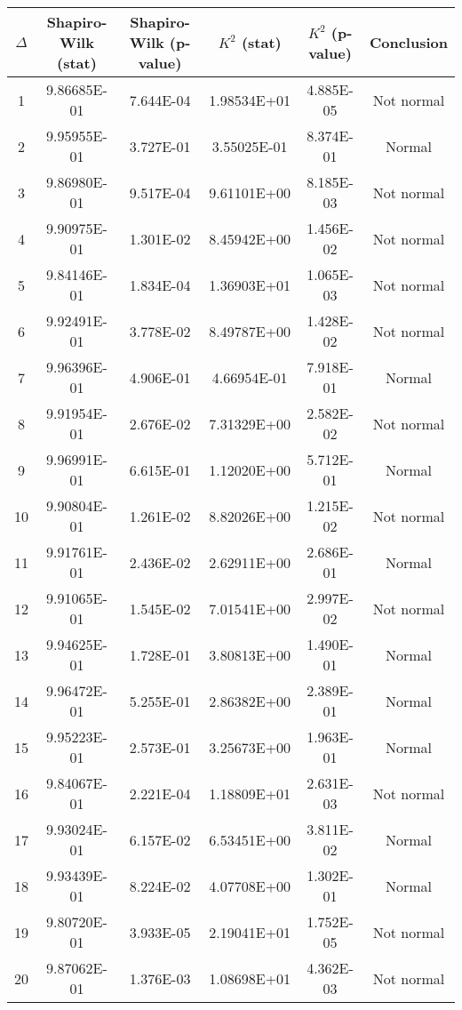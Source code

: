 \begin{table}[h]
	\begin{tabular}{|c|c|c|c|c|c|}
		\hline
		$\Delta$ &  Shapiro-Wilk (stat) & Shapiro-Wilk (p-value) & $K^2$ (stat) & $K^2$ (p-value) & Conclusion\\\hline
		\hline
		1 & 9.86685E-01 & 7.644E-04 & 1.98534E+01 & 4.885E-05 & Not normal\\\hline
		2 & 9.95955E-01 & 3.727E-01 & 3.55025E-01 & 8.374E-01 & Normal\\\hline
		3 & 9.86980E-01 & 9.517E-04 & 9.61101E+00 & 8.185E-03 & Not normal\\\hline
		4 & 9.90975E-01 & 1.301E-02 & 8.45942E+00 & 1.456E-02 & Not normal\\\hline
		5 & 9.84146E-01 & 1.834E-04 & 1.36903E+01 & 1.065E-03 & Not normal\\\hline
		6 & 9.92491E-01 & 3.778E-02 & 8.49787E+00 & 1.428E-02 & Not normal\\\hline
		7 & 9.96396E-01 & 4.906E-01 & 4.66954E-01 & 7.918E-01 & Normal\\\hline
		8 & 9.91954E-01 & 2.676E-02 & 7.31329E+00 & 2.582E-02 & Not normal\\\hline
		9 & 9.96991E-01 & 6.615E-01 & 1.12020E+00 & 5.712E-01 & Normal\\\hline
		10 & 9.90804E-01 & 1.261E-02 & 8.82026E+00 & 1.215E-02 & Not normal\\\hline
		11 & 9.91761E-01 & 2.436E-02 & 2.62911E+00 & 2.686E-01 & Normal\\\hline
		12 & 9.91065E-01 & 1.545E-02 & 7.01541E+00 & 2.997E-02 & Not normal\\\hline
		13 & 9.94625E-01 & 1.728E-01 & 3.80813E+00 & 1.490E-01 & Normal\\\hline
		14 & 9.96472E-01 & 5.255E-01 & 2.86382E+00 & 2.389E-01 & Normal\\\hline
		15 & 9.95223E-01 & 2.573E-01 & 3.25673E+00 & 1.963E-01 & Normal\\\hline
		16 & 9.84067E-01 & 2.221E-04 & 1.18809E+01 & 2.631E-03 & Not normal\\\hline
		17 & 9.93024E-01 & 6.157E-02 & 6.53451E+00 & 3.811E-02 & Normal\\\hline
		18 & 9.93439E-01 & 8.224E-02 & 4.07708E+00 & 1.302E-01 & Normal\\\hline
		19 & 9.80720E-01 & 3.933E-05 & 2.19041E+01 & 1.752E-05 & Not normal\\\hline
		20 & 9.87062E-01 & 1.376E-03 & 1.08698E+01 & 4.362E-03 & Not normal\\\hline

\end{tabular}
\end{table}
